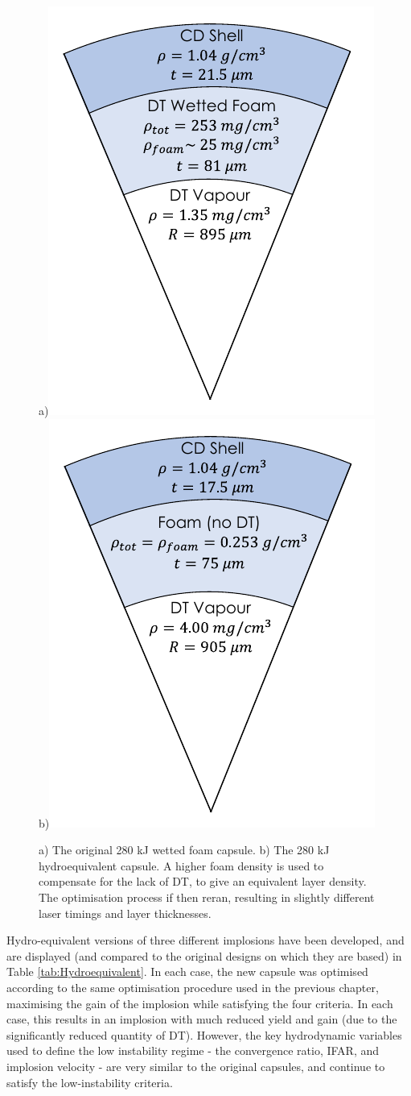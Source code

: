 \begin{figure} 
\centering     %
\subfigure a){\label{fig:280Cap}\includegraphics[width=.35\textwidth]{figures/LowCR/280Capsule.pdf}}
\subfigure b){\label{fig:280Hydro}\includegraphics[width=.35\textwidth]{figures/LowCR/280Hydro.pdf}}
\caption{\label{fig:Hydroequivalent} a) The original 280 kJ wetted foam capsule. b) The 280 kJ hydroequivalent capsule. A higher foam density is used to compensate for the lack of DT, to give an equivalent layer density. The optimisation process if then reran, resulting in slightly different laser timings and layer thicknesses.}
\end{figure}

Hydro-equivalent versions of three different implosions have been developed, and are displayed (and compared to the original designs on which they are based) in Table \ref{tab:Hydroequivalent}. In each case, the new capsule was optimised according to the same optimisation procedure used in the previous chapter, maximising the gain of the implosion while satisfying the four criteria. In each case, this results in an implosion with much reduced yield and gain (due to the significantly reduced quantity of DT). However, the key hydrodynamic variables used to define the low instability regime - the convergence ratio, IFAR, and implosion velocity - are very similar to the original capsules, and continue to satisfy the low-instability criteria.

